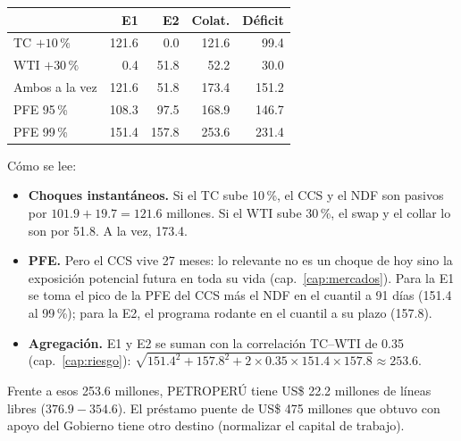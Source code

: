 \begin{center}\small
{}\label{tab:colateral-libro}
\begin{tabular}{@{}lrrrr@{}}
\toprule
& E1 & E2 & Colat. & Déficit\\
\midrule
TC $+10\,\%$ & 121.6 & 0.0 & 121.6 & 99.4\\
WTI $+30\,\%$ & 0.4 & 51.8 & 52.2 & 30.0\\
Ambos a la vez & 121.6 & 51.8 & 173.4 & 151.2\\
PFE 95\,\% & 108.3 & 97.5 & 168.9 & 146.7\\
PFE 99\,\% & 151.4 & 157.8 & 253.6 & 231.4\\
\bottomrule
\end{tabular}
\end{center}

Cómo se lee:
\begin{itemize}
\item \textbf{Choques instantáneos.} Si el TC sube 10\,\%, el CCS y el NDF son pasivos por $101.9+19.7=121.6$ millones. Si el WTI sube 30\,\%, el swap y el collar lo son por 51.8. A la vez, 173.4.
\item \textbf{PFE.} Pero el CCS vive 27 meses: lo relevante no es un choque de hoy sino la exposición potencial futura en toda su vida (cap.~\ref{cap:mercados}). Para la E1 se toma el pico de la PFE del CCS más el NDF en el cuantil a 91 días (151.4 al 99\,\%); para la E2, el programa rodante en el cuantil a su plazo (157.8).
\item \textbf{Agregación.} E1 y E2 se suman con la correlación TC--WTI de 0.35 (cap.~\ref{cap:riesgo}): $\sqrt{151.4^2+157.8^2+2\times0.35\times151.4\times157.8}\approx253.6$.
\end{itemize}

Frente a esos 253.6 millones, PETROPERÚ tiene US\$ 22.2 millones de líneas libres ($376.9-354.6$). El préstamo puente de US\$ 475 millones que obtuvo con apoyo del Gobierno tiene otro destino (normalizar el capital de trabajo).


